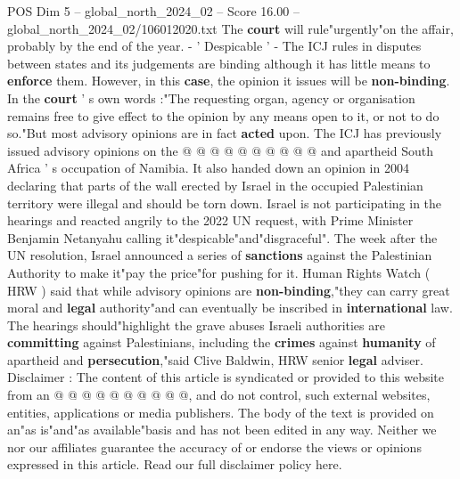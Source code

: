 \begin{textsample}{POS Dim 5 – global\_north\_2024\_02 – Score 16.00 – global\_north\_2024\_02/106012020.txt}
The \textbf{court} will rule"urgently"on the affair, probably by the end of the year. - ' Despicable ' - The ICJ rules in disputes between states and its judgements are binding although it has little means to \textbf{enforce} them.
However, in this \textbf{case}, the opinion it issues will be \textbf{non-binding}.
In the \textbf{court} ' s own words :"The requesting organ, agency or organisation remains free to give effect to the opinion by any means open to it, or not to do so."But most advisory opinions are in fact \textbf{acted} upon.
The ICJ has previously issued advisory opinions on the @ @ @ @ @ @ @ @ @ @ and apartheid South Africa ' s occupation of Namibia.
It also handed down an opinion in 2004 declaring that parts of the wall erected by Israel in the occupied Palestinian territory were illegal and should be torn down.
Israel is not participating in the hearings and reacted angrily to the 2022 UN request, with Prime Minister Benjamin Netanyahu calling it"despicable"and"disgraceful".
The week after the UN resolution, Israel announced a series of \textbf{sanctions} against the Palestinian Authority to make it"pay the price"for pushing for it.
Human Rights Watch ( HRW ) said that while advisory opinions are \textbf{non-binding},"they can carry great moral and \textbf{legal} authority"and can eventually be inscribed in \textbf{international} law.
The hearings should"highlight the grave abuses Israeli authorities are \textbf{committing} against Palestinians, including the \textbf{crimes} against \textbf{humanity} of apartheid and \textbf{persecution},"said Clive Baldwin, HRW senior \textbf{legal} adviser.
Disclaimer : The content of this article is syndicated or provided to this website from an @ @ @ @ @ @ @ @ @ @, and do not control, such external websites, entities, applications or media publishers.
The body of the text is provided on an"as is"and"as available"basis and has not been edited in any way.
Neither we nor our affiliates guarantee the accuracy of or endorse the views or opinions expressed in this article.
Read our full disclaimer policy here.

\end{textsample}
